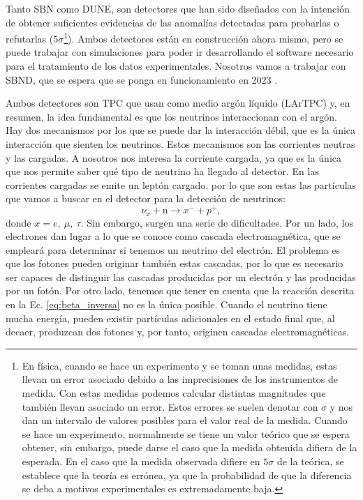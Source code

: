 \documentclass[a4paper,12pt,oneside,titlepage]{book}
\begin{document}
Tanto SBN como DUNE, son detectores que han sido diseñados con la intención de obtener suficientes evidencias de las anomalías detectadas para probarlas o refutarlas ($5\sigma$\footnote{En física, cuando se hace un experimento y se toman unas medidas, estas llevan un error asociado debido a las imprecisiones de los instrumentos de medida. Con estas medidas podemos calcular distintas magnitudes que también llevan asociado un error. Estos errores se suelen denotar con $\sigma$ y nos dan un intervalo de valores posibles para el valor real de la medida. Cuando se hace un experimento, normalmente se tiene un valor teórico que se espera obtener, sin embargo, puede darse el caso que la medida obtenida difiera de la esperada. En el caso que la medida observada difiere en $5\sigma$ de la teórica, se establece que la teoría es errónea, ya que la probabilidad de que la diferencia se deba a motivos experimentales es extremadamente baja.}). Ambos detectores están en construcción ahora mismo, pero se puede trabajar con simulaciones para poder ir desarrollando el software necesario para el tratamiento de los datos experimentales. Nosotros vamos a trabajar con SBND, que se espera que se ponga en funcionamiento en 2023 \cite{sbnd_page}.

Ambos detectores son TPC que usan como medio argón líquido (LArTPC) y, en resumen, la idea fundamental es que los neutrinos interaccionan con el argón. Hay dos mecanismos por los que se puede dar la interacción débil, que es la única interacción que sienten los neutrinos. Estos mecanismos son las corrientes neutras y las cargadas. A nosotros nos interesa la corriente cargada, ya que es la única que nos permite saber qué tipo de neutrino ha llegado al detector. En las corrientes cargadas se emite un leptón cargado, por lo que son estas las partículas que vamos a buscar en el detector para la detección de neutrinos:
\begin{equation}
  \label{eq:beta_inversa}
  \nu_x + \text{n} \rightarrow x^- + p^+,
\end{equation}
donde $x = e,~\mu,~\tau$. Sin embargo, surgen una serie de dificultades. Por un lado, los electrones dan lugar a lo que se conoce como cascada electromagnética, que se empleará para determinar si tenemos un neutrino del electrón. El problema es que los fotones pueden originar también estas cascadas, por lo que es necesario ser capaces de distinguir las cascadas producidas por un electrón y las producidas por un fotón. Por otro lado, tenemos que tener en cuenta que la reacción descrita en la Ec. \ref{eq:beta_inversa} no es la única posible. Cuando el neutrino tiene mucha energía, pueden existir partículas adicionales en el estado final que, al decaer, produzcan dos fotones y, por tanto, originen cascadas electromagnéticas. 
\end{document}
